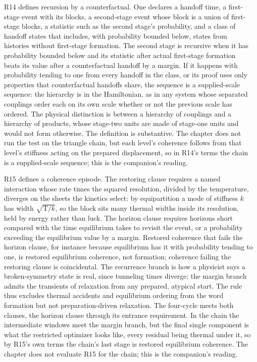 R14 defines recursion by a counterfactual. One declares a handoff time, a first-stage event with its
blocks, a second-stage event whose block is a union of first-stage blocks, a statistic such as the second
stage's probability, and a class of handoff states that includes, with probability bounded below, states
from histories without first-stage formation. The second stage is recursive when it has probability
bounded below and its statistic after actual first-stage formation beats its value after a counterfactual
handoff by a margin. If it happens with probability tending to one from every handoff in the class, or its
proof uses only properties that counterfactual handoffs share, the sequence is a supplied-scale sequence:
the hierarchy is in the Hamiltonian, as in any system whose separated couplings order each on its own scale
whether or not the previous scale has ordered. The physical distinction is between a hierarchy of
couplings and a hierarchy of products, whose stage-two units are made of stage-one units and would not
form otherwise. The definition is substantive. The chapter does not run the test on the triangle chain, but
each level's coherence follows from that level's stiffness acting on the prepared displacement, so in
R14's terms the chain is a supplied-scale sequence; this is the companion's reading.

R15 defines a coherence episode. The restoring clause requires a named interaction whose rate times the
squared resolution, divided by the temperature, diverges on the sheets the kinetics select: by
equipartition a mode of stiffness \(k\) has width \(\sqrt{\mathrm T/k}\), so the block sits many thermal widths
inside its resolution, held by energy rather than luck. The horizon clause requires horizons short compared
with the time equilibrium takes to revisit the event, or a probability exceeding the equilibrium value by a
margin. Restored coherence that fails the horizon clause, for instance because equilibrium has it with
probability tending to one, is restored equilibrium coherence, not formation; coherence failing the
restoring clause is coincidental. The recurrence branch is how a physicist says a broken-symmetry state is
real, since tunneling times diverge; the margin branch admits the transients of relaxation from any
prepared, atypical start. The rule thus excludes thermal accidents and equilibrium ordering from the word
formation but not preparation-driven relaxation. The four-cycle meets both clauses, the horizon clause
through its entrance requirement. In the chain the intermediate windows meet the margin branch, but the
final single component is what the restricted optimizer looks like, every residual being thermal under it,
so by R15's own terms the chain's last stage is restored equilibrium coherence. The chapter does not
evaluate R15 for the chain; this is the companion's reading.

